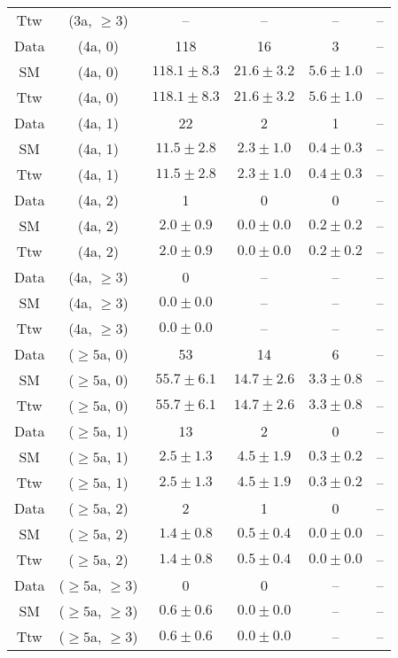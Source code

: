 \begin{table}[h!]
{\begin{tabular}{cccccc}
	Ttw & (3a, $\ge3$) & -- & -- & -- & -- \\[0.5ex] 
	Data & (4a, 0) & 118 & 16 & 3 & -- \\[0.5ex] 
	SM & (4a, 0) & $118.1\pm 8.3$ & $21.6\pm 3.2$ & $5.6\pm 1.0$ & -- \\[0.5ex] 
	Ttw & (4a, 0) & $118.1\pm 8.3$ & $21.6\pm 3.2$ & $5.6\pm 1.0$ & -- \\[0.5ex] 
	Data & (4a, 1) & 22 & 2 & 1 & -- \\[0.5ex] 
	SM & (4a, 1) & $11.5\pm 2.8$ & $2.3\pm 1.0$ & $0.4\pm 0.3$ & -- \\[0.5ex] 
	Ttw & (4a, 1) & $11.5\pm 2.8$ & $2.3\pm 1.0$ & $0.4\pm 0.3$ & -- \\[0.5ex] 
	Data & (4a, 2) & 1 & 0 & 0 & -- \\[0.5ex] 
	SM & (4a, 2) & $2.0\pm 0.9$ & $0.0\pm 0.0$ & $0.2\pm 0.2$ & -- \\[0.5ex] 
	Ttw & (4a, 2) & $2.0\pm 0.9$ & $0.0\pm 0.0$ & $0.2\pm 0.2$ & -- \\[0.5ex] 
	Data & (4a, $\ge3$) & 0 & -- & -- & -- \\[0.5ex] 
	SM & (4a, $\ge3$) & $0.0\pm 0.0$ & -- & -- & -- \\[0.5ex] 
	Ttw & (4a, $\ge3$) & $0.0\pm 0.0$ & -- & -- & -- \\[0.5ex] 
	Data & ($\ge5$a, 0) & 53 & 14 & 6 & -- \\[0.5ex] 
	SM & ($\ge5$a, 0) & $55.7\pm 6.1$ & $14.7\pm 2.6$ & $3.3\pm 0.8$ & -- \\[0.5ex] 
	Ttw & ($\ge5$a, 0) & $55.7\pm 6.1$ & $14.7\pm 2.6$ & $3.3\pm 0.8$ & -- \\[0.5ex] 
	Data & ($\ge5$a, 1) & 13 & 2 & 0 & -- \\[0.5ex] 
	SM & ($\ge5$a, 1) & $2.5\pm 1.3$ & $4.5\pm 1.9$ & $0.3\pm 0.2$ & -- \\[0.5ex] 
	Ttw & ($\ge5$a, 1) & $2.5\pm 1.3$ & $4.5\pm 1.9$ & $0.3\pm 0.2$ & -- \\[0.5ex] 
	Data & ($\ge5$a, 2) & 2 & 1 & 0 & -- \\[0.5ex] 
	SM & ($\ge5$a, 2) & $1.4\pm 0.8$ & $0.5\pm 0.4$ & $0.0\pm 0.0$ & -- \\[0.5ex] 
	Ttw & ($\ge5$a, 2) & $1.4\pm 0.8$ & $0.5\pm 0.4$ & $0.0\pm 0.0$ & -- \\[0.5ex] 
	Data & ($\ge5$a, $\ge3$) & 0 & 0 & -- & -- \\[0.5ex] 
	SM & ($\ge5$a, $\ge3$) & $0.6\pm 0.6$ & $0.0\pm 0.0$ & -- & -- \\[0.5ex] 
	Ttw & ($\ge5$a, $\ge3$) & $0.6\pm 0.6$ & $0.0\pm 0.0$ & -- & -- \\[0.5ex] 
	\hline
	\hline
\end{tabular}}
\end{table}
